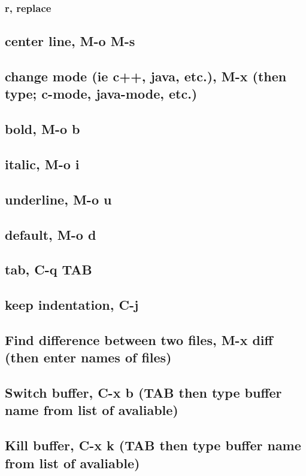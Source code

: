 \documentclass[11pt]{article}
\begin{document}
\subsubsection{r, replace}
\label{sec:orga56e497}
\subsection{center line, M-o M-s}
\label{sec:org1b8d7ab}
\subsection{change mode (ie c++, java, etc.), M-x (then type; c-mode, java-mode, etc.)}
\label{sec:org9e48bd8}
\subsection{bold, M-o b}
\label{sec:orgb60ab53}
\subsection{italic, M-o i}
\label{sec:org30e2a9f}
\subsection{underline, M-o u}
\label{sec:orgd5b65d0}
\subsection{default, M-o d}
\label{sec:org67ab539}
\subsection{tab, C-q TAB}
\label{sec:org1a46deb}
\subsection{keep indentation, C-j}
\label{sec:org4806700}
\subsection{Find difference between two files, M-x diff (then enter names of files)}
\label{sec:org9b01bde}
\subsection{Switch buffer, C-x b (TAB then type buffer name from list of avaliable)}
\label{sec:org5ed8103}
\subsection{Kill buffer, C-x k  (TAB then type buffer name from list of avaliable)}
\label{sec:orga06ccf8}
\end{document}
